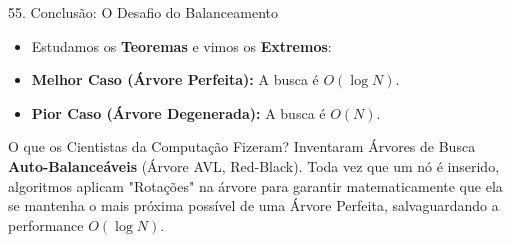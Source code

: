 \documentclass[9pt]{beamer}
\begin{document}
    \begin{frame}{55. Conclusão: O Desafio do Balanceamento}
        \begin{itemize}
            \item Estudamos os \textbf{Teoremas} e vimos os \textbf{Extremos}:
            \item \textbf{Melhor Caso (Árvore Perfeita):} A busca é $O(\log N)$.
            \item \textbf{Pior Caso (Árvore Degenerada):} A busca é $O(N)$.
        \end{itemize}
        \vspace{0.2cm}
        \begin{block}{O que os Cientistas da Computação Fizeram?}
            Inventaram Árvores de Busca \textbf{Auto-Balanceáveis} (Árvore AVL, Red-Black). Toda vez que um nó é inserido, algoritmos aplicam "Rotações" na árvore para garantir matematicamente que ela se mantenha o mais próxima possível de uma Árvore Perfeita, salvaguardando a performance $O(\log N)$.
        \end{block}
    \end{frame}

    
\end{document}
